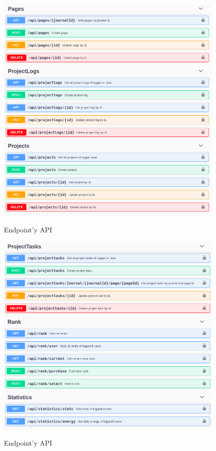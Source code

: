 \documentclass[a4paper,11pt]{report}
\begin{document}
\begin{figure}[H]
	\centering
	\includegraphics[scale=0.4]{implementacja/backend/pages_projectLogs_projects_api}\\
	\caption{Endpoint'y API}
	\label{fig:pages_projectLogs_projects_api}
\end{figure}
\begin{figure}[H]
	\centering
	\includegraphics[scale=0.4]{implementacja/backend/projectTasks_rank_statistics_api}\\
	\caption{Endpoint'y API}
	\label{fig:projectTasks_rank_statistics_api}
\end{figure}
\end{document}
